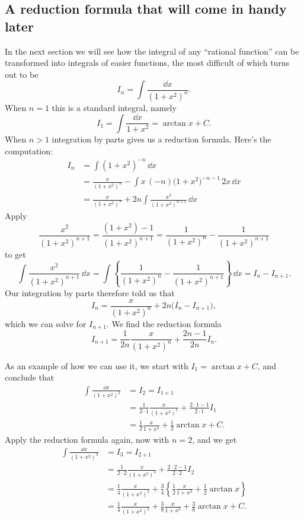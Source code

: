 \subsection{A reduction formula that will come in handy later} %
\label{sec:01pt-fracs-reduction}
In the next section we will see how the integral of any ``rational function''
can be transformed into integrals of easier functions, the most difficult of
which turns out to be
\[
I_n = \int \frac{\dd x}{(1+x^2)^n}.
\]
When $n=1$ this is a standard integral, namely
\[
I_1 = \int\frac{\dd x}{1+x^2} = \arctan x +C.
\]
When $n>1$ integration by parts gives us a reduction formula.  Here's the
computation:
\begin{align*}
  I_n &=  \int (1+x^2)^{-n}\,\dd x \\
  &=  \frac{ x}{(1+x^2)^n} - \int x\, (-n)\bigl(1+x^2\bigr)^{-n-1}\,2x\,\dd x \\
  &= \frac{ x}{(1+x^2)^n} +2n\int \frac{x^2} {(1+x^2)^{n+1}}\,\dd x
\end{align*}
Apply
\[
\dfrac{x^2} {(1+x^2)^{n+1}} =\dfrac{(1+x^2) -1} {(1+x^2)^{n+1}} = \frac{1}
{(1+x^2)^{n}}-\frac{1} {(1+x^2)^{n+1}}
\]
to get
\[
\int \frac{x^2} {(1+x^2)^{n+1}}\,\dd x =\int\left\{ \frac{1}
  {(1+x^2)^{n}}-\frac{1} {(1+x^2)^{n+1}}\right\}\,\dd x =I_n - I_{n+1}.
\]
Our integration by parts therefore told us that
\[
I_n = \frac{ x}{(1+x^2)^n} +2n\bigl(I_n-I_{n+1}\bigr),
\]
which we can solve for $I_{n+1}$. We find the reduction formula
\[
I_{n+1} = \frac1{2n}\frac{x}{(1+x^2)^n}+\frac{2n-1}{2n} I_n.
\]

As an example of how we can use it, we start with $I_1=\arctan x+C$, and
conclude that
\begin{align*}
  \int\frac{\dd x}{(1+x^2)^2}
  &= I_2 =I_{1+1} \\
  &=\frac1{2\cdot1}\frac{x}{(1+x^2)^1}+\frac{2\cdot1-1}{2\cdot1} I_1 \\
  &= \tfrac12\frac{x}{1+x^2}+\tfrac12 \arctan x +C.
\end{align*}
Apply the reduction formula again, now with $n=2$, and we get
\begin{align*}
  \int\frac{\dd x}{(1+x^2)^3} &= I_3 = I_{2+1} \\
  &= \frac1{2\cdot2}\frac{x}{(1+x^2)^2}+\frac{2\cdot2-1}{2\cdot2} I_2 \\
  &= \tfrac14\frac{x}{(1+x^2)^2}+\tfrac{3}{4} \left\{
    \tfrac12\frac{x}{1+x^2}+\tfrac{1}{2} \arctan x
  \right\} \\
  &= \tfrac14\frac{x}{(1+x^2)^2} +\tfrac{3}{8}\frac{x}{1+x^2} +\tfrac{3}{8}
  \arctan x +C.
\end{align*}

